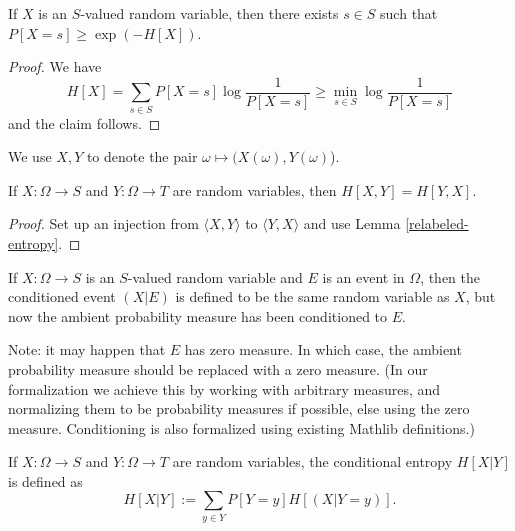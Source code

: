\begin{lemma}\label{bound-conc}
  If $X$ is an $S$-valued random variable, then there exists $s \in S$ such that $P[X=s] \geq \exp(-H[X])$.
\end{lemma}

\begin{proof}  We have
$$ H[X] = \sum_{s \in S} P[X=s] \log \frac{1}{P[X=s]} \geq \min_{s \in S} \log \frac{1}{P[X=s]}$$
and the claim follows.
\end{proof}

We use $X,Y$ to denote the pair $\omega \mapsto (X(\omega),Y(\omega)$).

\begin{lemma}\label{joint-symm}
  If $X: \Omega \to S$ and $Y: \Omega \to T$ are random variables, then $H[X,Y] = H[ Y,X]$.\end{lemma}

\begin{proof} Set up an injection from $\langle X,Y\rangle$ to $\langle Y,X\rangle$ and use Lemma \ref{relabeled-entropy}.
\end{proof}


\begin{definition}\label{condition-event-def}  If $X: \Omega \to S$ is an $S$-valued random variable and $E$ is an event in $\Omega$, then the conditioned event $(X|E)$ is defined to be the same random variable as $X$, but now the ambient probability measure has been conditioned to $E$.
\end{definition}

Note: it may happen that $E$ has zero measure.  In which case, the ambient probability measure should be replaced with a zero measure.  (In our formalization we achieve this by working with arbitrary measures, and normalizing them to be probability measures if possible, else using the zero measure.  Conditioning is also formalized using existing Mathlib definitions.)

\begin{definition}\label{conditional-entropy-def}
  \leanok
  If $X: \Omega \to S$ and $Y: \Omega \to T$ are random variables, the conditional entropy $H[X|Y]$ is defined as
  $$ H[X|Y] := \sum_{y \in Y} P[Y = y] H[(X | Y=y)].$$
\end{definition}

